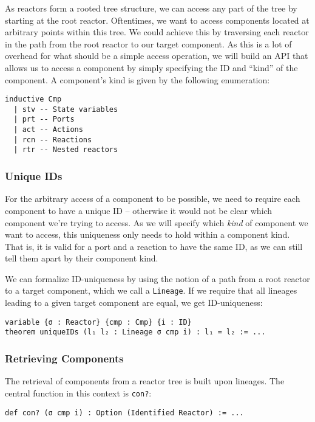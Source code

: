 As reactors form a rooted tree structure, we can access any part of the tree by starting at the root reactor.
Oftentimes, we want to access components located at arbitrary points within this tree.
We could achieve this by traversing each reactor in the path from the root reactor to our target component. 
As this is a lot of overhead for what should be a simple access operation, we will build an API that allows us to access a component by simply specifying the ID and ``kind'' of the component.
A component's kind is given by the following enumeration:

\begin{lstlisting}
inductive Cmp
  | stv -- State variables
  | prt -- Ports
  | act -- Actions
  | rcn -- Reactions
  | rtr -- Nested reactors
\end{lstlisting}

\subsubsection{Unique IDs}

For the arbitrary access of a component to be possible, we need to require each component to have a unique ID -- otherwise it would not be clear which component we're trying to access.
As we will specify which \emph{kind} of component we want to access, this uniqueness only needs to hold within a component kind.
That is, it is valid for a port and a reaction to have the same ID, as we can still tell them apart by their component kind.

We can formalize ID-uniqueness by using the notion of a path from a root reactor to a target component, which we call a \lstinline{Lineage}.
If we require that all lineages leading to a given target component are equal, we get ID-uniqueness:

\begin{lstlisting}
variable {σ : Reactor} {cmp : Cmp} {i : ID}
theorem uniqueIDs (l₁ l₂ : Lineage σ cmp i) : l₁ = l₂ := ...
\end{lstlisting}

\subsubsection{Retrieving Components}

The retrieval of components from a reactor tree is built upon lineages.
The central function in this context is \lstinline{con?}:

\begin{lstlisting}
def con? (σ cmp i) : Option (Identified Reactor) := ...
\end{lstlisting}

